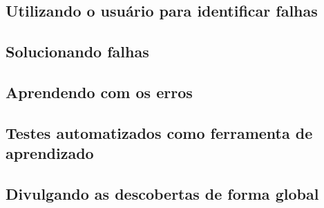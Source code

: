    \subsection{Utilizando o usuário para identificar falhas}
    \subsection{Solucionando falhas}
    \subsection{Aprendendo com os erros}
    \subsection{Testes automatizados como ferramenta de aprendizado}
    \subsection{Divulgando as descobertas de forma global}
